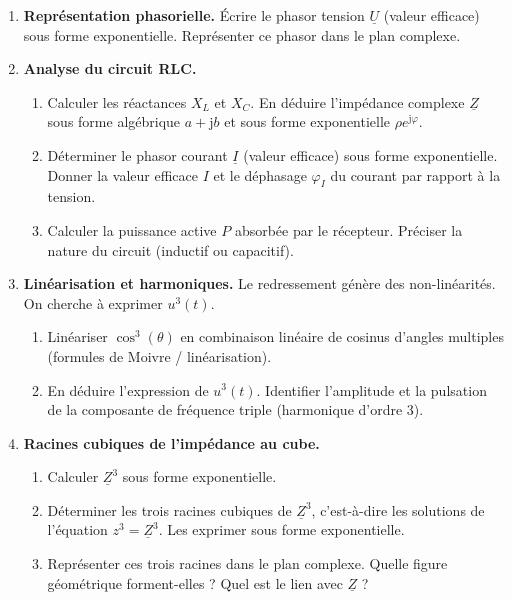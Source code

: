 \documentclass[11pt]{article}
\begin{document}
\begin{enumerate}
    \item \textbf{Représentation phasorielle.} Écrire le phasor tension $\underline{U}$ (valeur efficace) sous forme exponentielle. Représenter ce phasor dans le plan complexe.
    \item \textbf{Analyse du circuit RLC.}
    \begin{enumerate}
        \item Calculer les réactances $X_L$ et $X_C$. En déduire l'impédance complexe $\underline{Z}$ sous forme algébrique $a + \mathrm{j}b$ et sous forme exponentielle $\rho e^{\mathrm{j}\varphi}$.
        \item Déterminer le phasor courant $\underline{I}$ (valeur efficace) sous forme exponentielle. Donner la valeur efficace $I$ et le déphasage $\varphi_I$ du courant par rapport à la tension.
        \item Calculer la puissance active $P$ absorbée par le récepteur. Préciser la nature du circuit (inductif ou capacitif).
    \end{enumerate}
    \item \textbf{Linéarisation et harmoniques.} Le redressement génère des non-linéarités. On cherche à exprimer $u^3(t)$.
    \begin{enumerate}
        \item Linéariser $\cos^3(\theta)$ en combinaison linéaire de cosinus d'angles multiples (formules de Moivre / linéarisation).
        \item En déduire l'expression de $u^3(t)$. Identifier l'amplitude et la pulsation de la composante de fréquence triple (harmonique d'ordre 3).
    \end{enumerate}
    \item \textbf{Racines cubiques de l'impédance au cube.}
    \begin{enumerate}
        \item Calculer $\underline{Z}^3$ sous forme exponentielle.
        \item Déterminer les trois racines cubiques de $\underline{Z}^3$, c'est-à-dire les solutions de l'équation $z^3 = \underline{Z}^3$. Les exprimer sous forme exponentielle.
        \item Représenter ces trois racines dans le plan complexe. Quelle figure géométrique forment-elles ? Quel est le lien avec $\underline{Z}$ ?
    \end{enumerate}
\end{enumerate}
\end{document}
